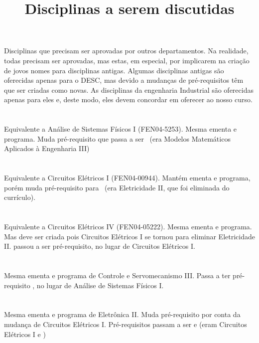 \documentclass[]{article}
\title{Disciplinas a serem discutidas}
\author{}
\begin{document}
\maketitle

Disciplinas que precisam ser aprovadas por outros departamentos. Na realidade, todas precisam ser aprovadas, mas estas, em especial, por implicarem na criação de jovos nomes para disciplinas antigas. Algumas disciplinas antigas são oferecidas apenas para o DESC, mas devido a mudanças de pré-requisitos têm que ser criadas como novas. As disciplinas da engenharia Industrial são oferecidas apenas para eles e, deste modo, eles devem concordar em oferecer ao nosso curso. 

\section{\AnaFis}
Equivalente a Análise de Sistemas Físicos I (FEN04-5253). Mesma ementa e programa. Muda pré-requisito que passa a ser \textbf{\CEVI}  ~(era Modelos Matemáticos Aplicados à Engenharia III)

\section{\CEV}
Equivalente a Circuitos Elétricos I (FEN04-00944). Mantém ementa e programa, porém muda pré-requisito para \textbf{\FisIII} ~(era Eletricidade II, que foi eliminada do currículo).

\section{\CEVI}
Equivalente a Circuitos Elétricos IV (FEN04-05222). Mesma ementa e programa. Mas deve ser criada pois Circuitos Elétricos I se tornou \CEV para eliminar Eletricidade II. \textbf{\CEV} passou a ser pré-requisito, no lugar de Circuitos Elétricos I.

\section{\CServMec}
Mesma ementa e programa de Controle e Servomecanismo III. Passa a ter pré-requisito \textbf{\AnaFis}, no lugar de Análise de Sistemas Físicos I.

\section{\EletIIA}
Mesma ementa e programa de Eletrônica II. Muda pré-requisito por conta da mudança de Circuitos Elétricos I. Pré-requisitos passam a ser \CEV e \EletI (eram Circuitos Elétricos I e \EletI)
\end{document}
